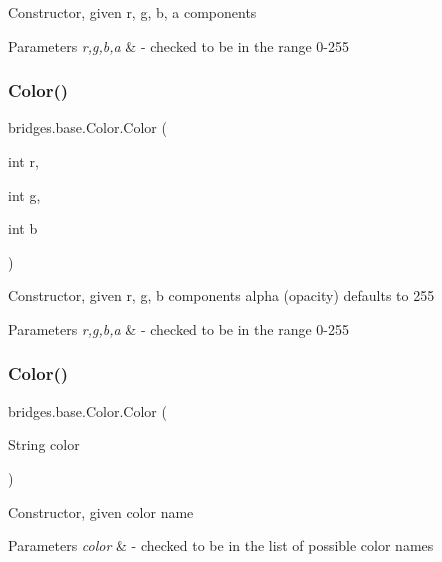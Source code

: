 Constructor, given r, g, b, a components


\begin{DoxyParams}{Parameters}
{\em r,g,b,a} & -\/ checked to be in the range 0-\/255 \\
\hline
\end{DoxyParams}
\mbox{\label{classbridges_1_1base_1_1_color_a5fab564fa4eec8bece64f847ebd42948}} 
\subsubsection{\texorpdfstring{Color()}{Color()}\hspace{0.1cm}{\footnotesize\ttfamily [3/4]}}
{\footnotesize\ttfamily bridges.\+base.\+Color.\+Color (\begin{DoxyParamCaption}\item[{int}]{r,  }\item[{int}]{g,  }\item[{int}]{b }\end{DoxyParamCaption})}

Constructor, given r, g, b components alpha (opacity) defaults to 255


\begin{DoxyParams}{Parameters}
{\em r,g,b,a} & -\/ checked to be in the range 0-\/255 \\
\hline
\end{DoxyParams}
\mbox{\label{classbridges_1_1base_1_1_color_a5cb17fdf8eddf44fc0763ceb7d4d833b}} 
\subsubsection{\texorpdfstring{Color()}{Color()}\hspace{0.1cm}{\footnotesize\ttfamily [4/4]}}
{\footnotesize\ttfamily bridges.\+base.\+Color.\+Color (\begin{DoxyParamCaption}\item[{String}]{color }\end{DoxyParamCaption})}

Constructor, given color name


\begin{DoxyParams}{Parameters}
{\em color} & -\/ checked to be in the list of possible color names \\
\hline
\end{DoxyParams}


